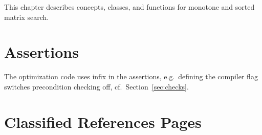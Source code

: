



This chapter describes concepts, classes, and functions for 
monotone and sorted matrix search.

\section*{Assertions}
The optimization code uses infix  in the assertions,
e.g.\ defining the compiler flag
 switches precondition
checking off, cf.~Section~\ref{sec:checks}.

\section{Classified References Pages}


\\[1ex]
\\[1ex]
\\

\smallskip

\\[1ex]
\\[1ex]

\smallskip





